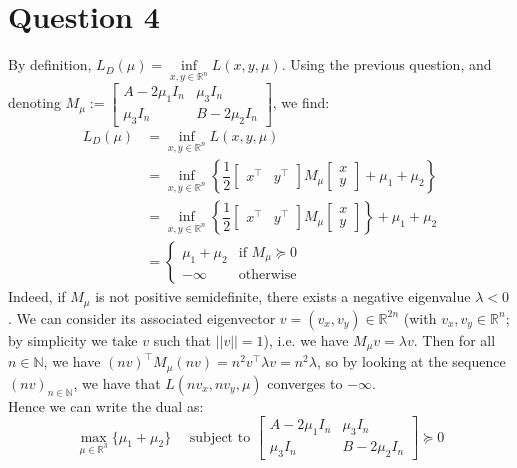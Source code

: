 \documentclass{article}
\newcommand{\R}{\mathbb{R}}
\newcommand{\N}{\mathbb{N}}
\newcommand{\tp}{^\top}
\begin{document}
\section*{Question 4}
By definition, $L_D(\mu)=\inf\limits_{x,y\in\R^n} L(x,y,\mu)$. Using the previous question, and denoting $M_\mu:=\begin{bmatrix} A-2\mu_1 I_n & \mu_3 I_n \\
\mu_3 I_n & B-2\mu_2 I_n \end{bmatrix}$, we find:
\begin{align*}
L_D(\mu)&=\inf\limits_{x,y\in\R^n} L(x,y,\mu) \\
&=\inf\limits_{x,y\in\R^n} \left\lbrace \dfrac{1}{2} \begin{bmatrix} x\tp & y\tp\end{bmatrix}M_\mu\begin{bmatrix} x \\ y \end{bmatrix} +\mu_1+\mu_2 \right\rbrace \\
&=\inf\limits_{x,y\in\R^n} \left\lbrace \dfrac{1}{2} \begin{bmatrix} x\tp & y\tp\end{bmatrix}M_\mu\begin{bmatrix} x \\ y \end{bmatrix} \right\rbrace+\mu_1+\mu_2   \\
&=\begin{cases} \mu_1+\mu_2 &\text{if }M_\mu\succeq 0 \\ -\infty &\text{otherwise} \end{cases}
\end{align*}
Indeed, if $M_\mu$ is not positive semidefinite, there exists a negative eigenvalue $\lambda<0$. We can consider its associated eigenvector $v = (v_x, v_y) \in \R^{2n}$ (with $v_x,v_y\in\R^n$; by simplicity we take $v$ such that $||v||=1$), i.e. we have $ M_\mu v=\lambda v$. Then for all $ n \in \N$, we have $(nv)\tp M_\mu (nv)=n^2 v\tp \lambda v=n^2 \lambda$, so by looking at the sequence $(nv)_{n \in \N}$, we have that $L(nv_x,nv_y,\mu) $ converges to $-\infty$.\\
Hence we can write the dual as:
\begin{equation*}\tag{D} \label{D}
\max_{\mu\in\R^3} \{\mu_1+\mu_2\} \quad \text{ subject to } \begin{bmatrix} A-2\mu_1 I_n & \mu_3 I_n \\
\mu_3 I_n & B-2\mu_2 I_n \end{bmatrix} \succeq 0
\end{equation*}
\end{document}
